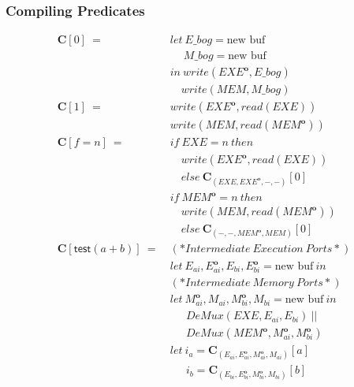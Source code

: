 \documentclass[sigconf,usenames,dvipsnames,svgnames,table]{acmart}
\newcommand{\obf}[1]{#1^\mathbf{o}}
\begin{document}
      \subsubsection{Compiling Predicates}\label{sec:comp:comp:pred}
        \begin{figure}
          \begin{align*}
            \mathbf{C}[0]\ 
              =\ &
              let\    E\_bog = \text{new buf}\\
              &\quad\ M\_bog = \text{new buf}\\
              &in\ write(\obf{EXE}, E\_bog)\\
              &\quad  write(MEM, M\_bog)\\
            \mathbf{C}[1]\ 
              =\ &
              write(\obf{EXE}, read(EXE))\\
              &write(MEM, read(\obf{MEM}))
              \\
            \mathbf{C}[f = n]\
              =\
              &if\ EXE=n\ then\\
              &\quad write(\obf{EXE}, read(EXE))\\
              &\quad else\ \mathbf{C}_{(EXE, \obf{EXE}, -, -)}[0]\\
              &if\ \obf{MEM}=n\ then\\
              &\quad write(MEM, read(\obf{MEM}))\\
              &\quad else\ \mathbf{C}_{(-, -, \obf{MEM}, MEM)}[0]\\
            \mathbf{C}[\mathsf{test}(a + b)]\ 
              =\
              & (*Intermediate\ Execution\ Ports*)\\
              & let\ E_{ai}, \obf{E}_{ai}, E_{bi}, \obf{E}_{bi} = \text{new buf}\ in\\
              & (*Intermediate\ Memory\ Ports*)\\
              & let\ \obf{M}_{ai}, M_{ai}, \obf{M}_{bi}, M_{bi} = \text{new buf}\ in\\
              &\quad\ \ DeMux(EXE, E_{ai}, E_{bi})\ ||\\
              &\quad\ \ DeMux(\obf{MEM}, \obf{M}_{ai}, \obf{M}_{bi})\\
              &let\     i_a = \mathbf{C}_{(E_{ai},\obf{E}_{ai},\obf{M}_{ai},M_{ai})}[a]\\
              &\quad\ \ i_b = \mathbf{C}_{(E_{bi},\obf{E}_{bi},\obf{M}_{bi},M_{bi})}[b]\\

\end{align*}
\end{figure}
\end{document}
